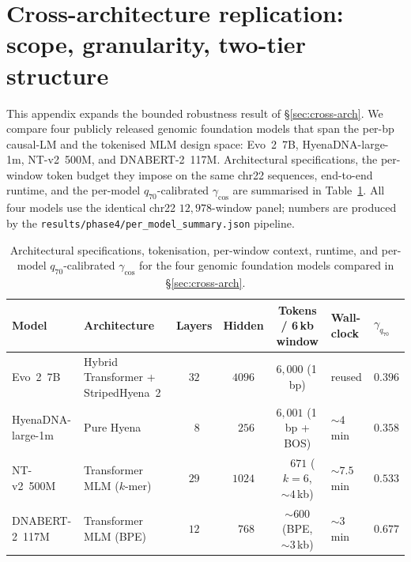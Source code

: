\documentclass{article}
\theoremstyle{plain}
\theoremstyle{definition}
\theoremstyle{remark}
\begin{document}
\section{Cross-architecture replication: scope, granularity, two-tier structure}
\label{app:cross-arch}

This appendix expands the bounded robustness result of
\S\ref{sec:cross-arch}. We compare four publicly released genomic
foundation models that span the per-bp causal-LM and the tokenised MLM
design space: Evo~2~7B, HyenaDNA-large-1m, NT-v2~500M, and
DNABERT-2~117M. Architectural specifications, the per-window token budget
they impose on the same chr22 sequences, end-to-end runtime, and the
per-model $q_{70}$-calibrated $\gamma_{\cos}$ are summarised in
Table~\ref{tab:fm-specs}. All four models use the identical chr22
$12{,}978$-window panel; numbers are produced by the
\texttt{results/phase4/per\_model\_summary.json} pipeline.

\begin{table}[!htbp]
\caption{Architectural specifications, tokenisation, per-window context,
runtime, and per-model $q_{70}$-calibrated $\gamma_{\cos}$ for the four
genomic foundation models compared in \S\ref{sec:cross-arch}.}
\label{tab:fm-specs}
\centering
\footnotesize
\setlength{\tabcolsep}{4pt}
\begin{tabular}{@{}llcccll@{}}
\toprule
Model & Architecture & Layers & Hidden & Tokens / 6\,kb window
   & Wall-clock & $\gamma_{q_{70}}$ \\
\midrule
Evo~2~7B          & Hybrid Transformer + StripedHyena~2 & $32$ & $4096$
   & $6{,}000$ (1\,bp)         & reused      & $0.396$ \\
HyenaDNA-large-1m & Pure Hyena                          & $\phantom{0}8$ & $\phantom{0}256$
   & $6{,}001$ (1\,bp + BOS)   & $\sim 4$\,min    & $0.358$ \\
NT-v2~500M        & Transformer MLM ($k$-mer)           & $29$ & $1024$
   & $\phantom{0,}671$ ($k=6$, $\sim 4$\,kb) & $\sim 7.5$\,min  & $0.533$ \\
DNABERT-2~117M    & Transformer MLM (BPE)               & $12$ & $\phantom{0}768$
   & $\sim 600$ (BPE, $\sim 3$\,kb)        & $\sim 3$\,min    & $0.677$ \\
\bottomrule
\end{tabular}
\end{table}
\end{document}
